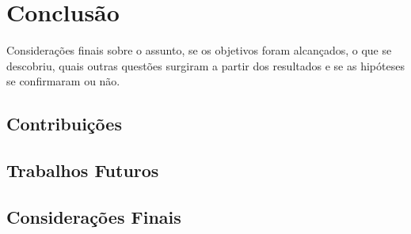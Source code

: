\chapter{Conclusão} \label{cap:conclusao}
Considerações finais sobre o assunto, se os objetivos foram alcançados, o que se descobriu, quais outras questões surgiram a partir dos resultados e se as hipóteses se confirmaram ou não.
\section{Contribuições}
\section{Trabalhos Futuros}
\section{Considerações Finais}